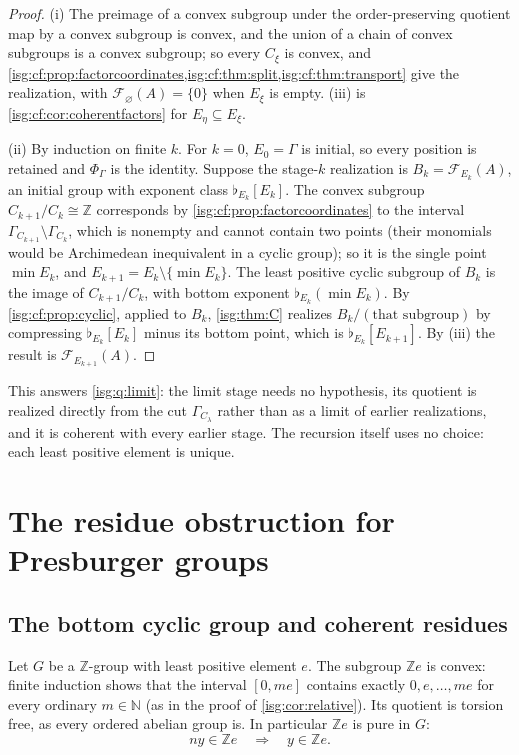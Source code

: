 \documentclass[11pt]{article}
\theoremstyle{definition}
\theoremstyle{remark}
\newcommand{\Z}{\mathbb{Z}}
\newcommand{\N}{\mathbb{N}}
\newcommand{\cmp}[1]{\flat_{#1}}
\begin{document}
\begin{proof}
(i) The preimage of a convex subgroup under the order-preserving quotient
map by a convex subgroup is convex, and the union of a chain of convex
subgroups is a convex subgroup; so every $C_\xi$ is convex, and
\cref{isg:cf:prop:factorcoordinates,isg:cf:thm:split,isg:cf:thm:transport}
give the realization, with $\mathcal F_\varnothing(A)=\{0\}$ when $E_\xi$
is empty. (iii) is \cref{isg:cf:cor:coherentfactors} for
$E_\eta\subseteq E_\xi$.

(ii) By induction on finite $k$. For $k=0$, $E_0=\Gamma$ is initial, so
every position is retained and $\Phi_\Gamma$ is the identity. Suppose the
stage-$k$ realization is $B_k=\mathcal F_{E_k}(A)$, an initial group with
exponent class $\cmp{E_k}[E_k]$. The convex subgroup $C_{k+1}/C_k\cong\Z$
corresponds by \cref{isg:cf:prop:factorcoordinates} to the interval
$\Gamma_{C_{k+1}}\setminus\Gamma_{C_k}$, which is nonempty and cannot
contain two points (their monomials would be Archimedean inequivalent in a
cyclic group); so it is the single point $\min E_k$, and
$E_{k+1}=E_k\setminus\{\min E_k\}$. The least positive cyclic subgroup
of $B_k$ is the image of $C_{k+1}/C_k$, with bottom exponent
$\cmp{E_k}(\min E_k)$. By \cref{isg:cf:prop:cyclic}, applied to $B_k$,
\cref{isg:thm:C} realizes $B_k/(\text{that subgroup})$ by compressing
$\cmp{E_k}[E_k]$ minus its bottom point, which is $\cmp{E_k}[E_{k+1}]$.
By (iii) the result is $\mathcal F_{E_{k+1}}(A)$.
\end{proof}

This answers \cref{isg:q:limit}: the limit stage needs no hypothesis, its
quotient is realized directly from the cut $\Gamma_{C_\lambda}$ rather
than as a limit of earlier realizations, and it is coherent with every
earlier stage. The recursion itself uses no choice: each least positive
element is unique.

\section{The residue obstruction for Presburger groups}\label{isg:cf:sec:presburger}

\subsection{The bottom cyclic group and coherent residues}
Let $G$ be a $\Z$-group with least positive element $e$. The subgroup
$\Z e$ is convex: finite induction shows that the interval $[0,me]$
contains exactly $0,e,\ldots,me$ for every ordinary $m\in\N$ (as in the
proof of \cref{isg:cor:relative}). Its quotient is torsion free, as every
ordered abelian group is. In particular $\Z e$ is pure in $G$:
\[
 ny\in\Z e\quad\Longrightarrow\quad y\in\Z e.
\]
\end{document}
